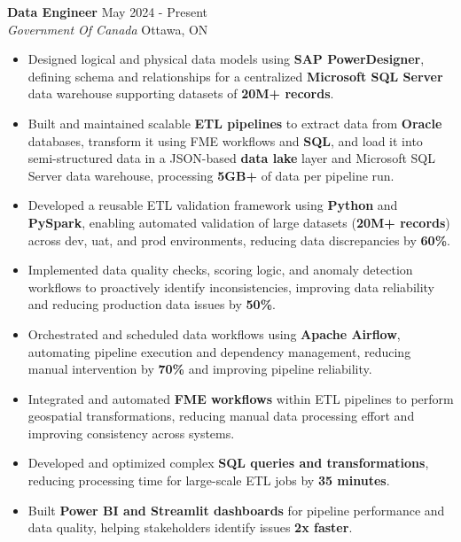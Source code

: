 \documentclass[a4paper]{article}
\begin{document}
\textbf{Data Engineer} \hfill May 2024 - Present\\
\textit{Government Of Canada} \hfill Ottawa, ON\\
\vspace{-2mm}
\begin{itemize} \itemsep -2pt

\item Designed logical and physical data models using \textbf{SAP PowerDesigner}, defining schema and relationships for a centralized \textbf{Microsoft SQL Server} data warehouse supporting datasets of \textbf{20M+ records}.

\item Built and maintained scalable \textbf{ETL pipelines} to extract data from \textbf{Oracle} databases, transform it using FME workflows and \textbf{SQL}, and load it into semi-structured data in a JSON-based \textbf{data lake} layer and Microsoft SQL Server data warehouse, processing \textbf{5GB+} of data per pipeline run.

\item Developed a reusable ETL validation framework using \textbf{Python} and \textbf{PySpark}, enabling automated validation of large datasets (\textbf{20M+ records}) across dev, uat, and prod environments, reducing data discrepancies by \textbf{60\%}.

\item Implemented data quality checks, scoring logic, and anomaly detection workflows to proactively identify inconsistencies, improving data reliability and reducing production data issues by \textbf{50\%}.

\item Orchestrated and scheduled data workflows using \textbf{Apache Airflow}, automating pipeline execution and dependency management, reducing manual intervention by \textbf{70\%} and improving pipeline reliability.

\item Integrated and automated \textbf{FME workflows} within ETL pipelines to perform geospatial transformations, reducing manual data processing effort and improving consistency across systems.

\item Developed and optimized complex \textbf{SQL queries and transformations}, reducing processing time for large-scale ETL jobs by \textbf{35 minutes}.

\item Built \textbf{Power BI and Streamlit dashboards} for pipeline performance and data quality, helping stakeholders identify issues \textbf{2x faster}.

\end{itemize}
\end{document}
